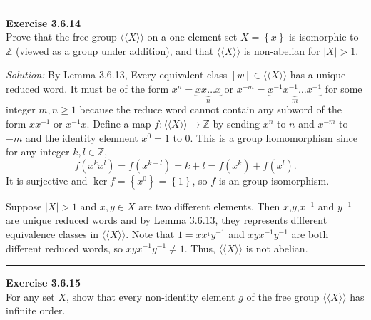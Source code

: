 \documentclass[a4paper, 12pt]{article}
\newenvironment{problem}[2][Exercise]
    { \begin{mdframed}[backgroundcolor=gray!20] \textbf{#1 #2} \\}
    {  \end{mdframed}}
\newenvironment{solution}
    {\textit{Solution:}}
    {}
\begin{document}
\\ 
\noindent\rule{7in}{2.8pt}
\begin{problem}{3.6.14}
Prove that the free group \(\langle\langle X\rangle\rangle\) on a one element set \(X=\left\{ x \right\}\) is isomorphic to \(\mathbb{Z}\) (viewed as a group under addition), and that 
\(\langle\langle X\rangle\rangle\) is non-abelian for \(|X|>1\).
\end{problem}
\begin{solution}
By Lemma 3.6.13, Every equivalent class \([w]\in \langle\langle X\rangle\rangle\) has a unique reduced word. It must be of the form \(x^n=\underbrace{xx\ldots x}_{n}\) or \(x^{-m}=\underbrace{x^{-1}x^{-1}\ldots x^{-1}}_m\) 
for some integer \(m,n\geq 1\) because the reduce word cannot contain any subword of the form \(xx^{-1}\) or \(x^{-1}x\). Define a map \(f:\langle\langle X\rangle\rangle\rightarrow \mathbb{Z}\) by sending 
\(x^n\) to \(n\) and \(x^{-m}\) to \(-m\) and the identity elenment \(x^0=1\) to \(0\). This is a group homomorphism since for any integer \(k,l\in \mathbb{Z}\), 
$$f(x^k x^l)=f(x^{k+l})=k+l=f(x^k)+f(x^l).$$
It is surjective and \(\ker f=\left\{ x^0 \right\}=\left\{ 1 \right\}\), so \(f\) is an group isomorphism. 
\par 
Suppose \(|X|>1\) and \(x,y\in X\) are two different elements. Then \(x\),\(y\),\(x^{-1}\) and \(y^{-1}\) are unique reduced words and by Lemma 3.6.13, they represents different equivalence classes in 
\(\langle \langle X\rangle \rangle\). Note that \(1=xx^{_1}y^{-1}\) and \(xyx^{-1}y^{-1}\) are both different reduced words, so \(xyx^{-1}y^{-1}\neq 1\). Thus, \(\langle\langle X\rangle\rangle\) is not abelian.
\end{solution}
\\ 
\noindent\rule{7in}{2.8pt}
\begin{problem}{3.6.15}
For any set \(X\), show that every non-identity element \(g\) of the free group \(\langle\langle X\rangle\rangle\) has infinite order.
\end{problem}
\end{document}
